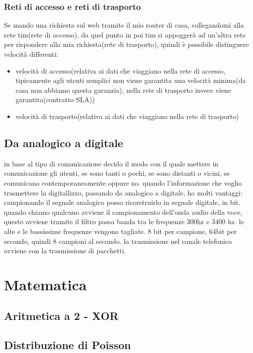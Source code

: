 \subsubsection{Reti di accesso e reti di trasporto}
Se mando una richiesta sul web tramite il mio router di casa, collegandomi alla rete tim(rete di accesso), da quel punto in poi tim si appoggerà ad un’altra rete per rispondere alla mia richiesta(rete di trasporto), quindi è possibile distinguere velocità differenti: 
\begin{itemize}
    \item velocità di accesso(relativa ai dati che viaggiano nella rete di accesso, tipicamente agli utenti semplici non viene garantita una velocità minima(da casa non abbiamo questa garanzia), nella rete di trasporto invece viene garantita(contratto SLA))
    \item velocità di trasporto(relativa ai dati che viaggiano nella rete di trasporto)
\end{itemize}

\subsection{Da analogico a digitale}
in base al tipo di comunicazione decido il modo con il quale mettere in comunicazione gli utenti, se sono tanti o pochi, se sono distanti o vicini, se comunicano contemporaneamente oppure no.
quando l'informazione che voglio trasmettere la digitallizzo, passando da analogico a digitale, ho molti vantaggi:
campionando il segnale analogico posso ricorstruirlo in segnale digitale, in bit.
quando chiamo qualcuno avviene il campionamento dell'onda audio della voce, questo avviene tramite il filtro passa banda tra le frequenze 300hz e 3400 hz. le alte e le bassissime frequenze vengono tagliate. 8 bit per campione, 64bit per secondo, quindi 8 campioni al secondo. la trasmissione nel canale telefonico avviene con la trasmissione di pacchetti.


\newpage
\section{Matematica}
\subsection{Aritmetica a 2 - XOR}
\subsection{Distribuzione di Poisson}
